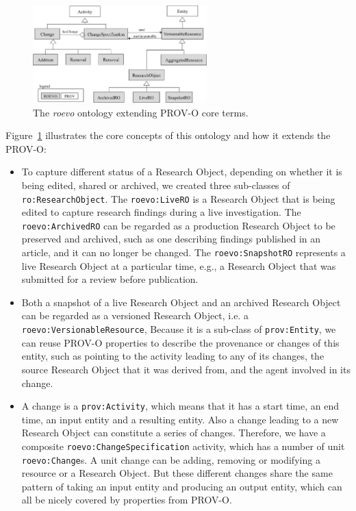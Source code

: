 \begin{figure}[ht]
  \centering
  \includegraphics[width=0.6\textwidth]{Figures/roevo.png}
  \caption{The \textit{roevo} ontology extending PROV-O core terms.}
  \label{fig:ro_evo}
\end{figure}    

Figure~\ref{fig:ro_evo} illustrates the core concepts of this ontology and how it extends the PROV-O:
\begin{itemize}
\item To capture different status of a Research Object, depending on whether it is being edited, shared or archived, we created three sub-classes of \texttt{ro:ResearchObject}. The \texttt{roevo:LiveRO} is a Research Object that is being edited to capture research findings during a live investigation. The \texttt{roevo:ArchivedRO} can be regarded as a production Research Object to be preserved and archived, such as one describing findings published in an article, and it can no longer be changed. The \texttt{roevo:SnapshotRO} represents a live Research Object at a particular time, e.g., a Research Object that was submitted for a review before publication.
\item Both a snapshot of a live Research Object and an archived Research Object can be regarded as a versioned Research Object, i.e. a \texttt{roevo:VersionableResource}, Because it is a sub-class of \texttt{prov:Entity}, we can reuse PROV-O properties to describe the provenance or changes of this entity, such as pointing to the activity leading to any of its changes, the source Research Object that it was derived from, and the agent involved in its change.
\item A change is a \texttt{prov:Activity}, which means that it has a start time, an end time, an input entity and a resulting entity. Also a change leading to a new Research Object can constitute a series of changes. Therefore, we have a composite \texttt{roevo:ChangeSpecification} activity, which has a number of unit \texttt{roevo:Change}s. A unit change can be adding, removing or modifying a resource or a Research Object. But these different changes share the same pattern of taking an input entity and producing an output entity, which can all be nicely covered by properties from PROV-O.
\end{itemize}

